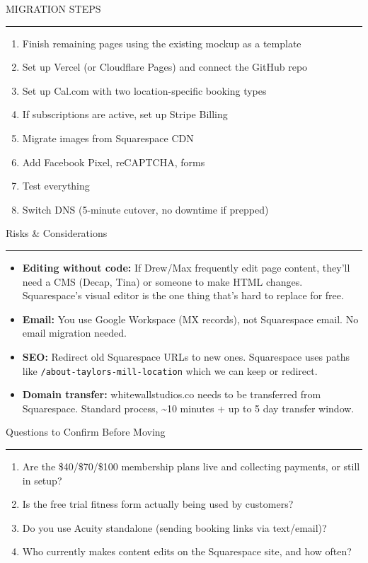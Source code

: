\documentclass[10pt,letterpaper]{article}
\newcommand{\reportsection}[1]{%
  \vspace{10pt}%
  {\cormorantsemibold\fontsize{16}{18}\selectfont\color{wwsBlack}#1}%
  \par\vspace{2pt}%
  {\color{wwsAccent}\rule{\linewidth}{1.5pt}}%
  \par\vspace{4pt}%
}
\newcommand{\reportsubsection}[1]{%
  \vspace{6pt}%
  {\intersemibold\fontsize{9}{11}\selectfont\color{wwsDark}\MakeUppercase{#1}}%
  \par\vspace{1pt}%
  {\color{wwsGray}\rule{\linewidth}{0.4pt}}%
  \par\vspace{3pt}%
}
\begin{document}
\reportsubsection{Migration Steps}

\begin{enumerate}
  \item Finish remaining pages using the existing mockup as a template
  \item Set up Vercel (or Cloudflare Pages) and connect the GitHub repo
  \item Set up Cal.com with two location-specific booking types
  \item If subscriptions are active, set up Stripe Billing
  \item Migrate images from Squarespace CDN
  \item Add Facebook Pixel, reCAPTCHA, forms
  \item Test everything
  \item Switch DNS (5-minute cutover, no downtime if prepped)
\end{enumerate}

\reportsection{Risks \& Considerations}

\begin{itemize}
  \item \textbf{Editing without code:} If Drew/Max frequently edit page content, they'll need a CMS (Decap, Tina) or someone to make HTML changes. Squarespace's visual editor is the one thing that's hard to replace for free.
  \item \textbf{Email:} You use Google Workspace (MX records), not Squarespace email. No email migration needed.
  \item \textbf{SEO:} Redirect old Squarespace URLs to new ones. Squarespace uses paths like \texttt{/about-taylors-mill-location} which we can keep or redirect.
  \item \textbf{Domain transfer:} whitewallstudios.co needs to be transferred from Squarespace. Standard process, \textasciitilde10 minutes + up to 5 day transfer window.
\end{itemize}

\reportsection{Questions to Confirm Before Moving}

\begin{enumerate}
  \item Are the \$40/\$70/\$100 membership plans live and collecting payments, or still in setup?
  \item Is the free trial fitness form actually being used by customers?
  \item Do you use Acuity standalone (sending booking links via text/email)?
  \item Who currently makes content edits on the Squarespace site, and how often?
\end{enumerate}
\end{document}
